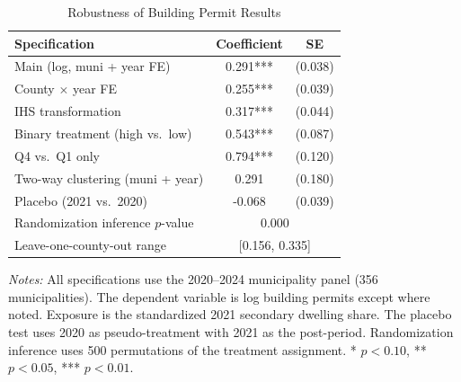 \begin{table}[t]
\centering
\caption{Robustness of Building Permit Results}
\label{tab:robustness}
\begin{tabular}{lcc}
\hline\hline
Specification & Coefficient & SE \\
\hline
Main (log, muni + year FE) & 0.291*** & (0.038) \\
County $\times$ year FE & 0.255*** & (0.039) \\
IHS transformation & 0.317*** & (0.044) \\
Binary treatment (high vs.\ low) & 0.543*** & (0.087) \\
Q4 vs.\ Q1 only & 0.794*** & (0.120) \\
Two-way clustering (muni + year) & 0.291 & (0.180) \\
Placebo (2021 vs.\ 2020) & -0.068 & (0.039) \\
\hline
Randomization inference $p$-value & \multicolumn{2}{c}{0.000} \\
Leave-one-county-out range & \multicolumn{2}{c}{[0.156, 0.335]} \\
\hline\hline
\end{tabular}
\begin{minipage}{0.85\textwidth}
\vspace{0.3em}
\footnotesize \textit{Notes:} All specifications use the 2020--2024 municipality panel (356 municipalities). The dependent variable is log building permits except where noted. Exposure is the standardized 2021 secondary dwelling share. The placebo test uses 2020 as pseudo-treatment with 2021 as the post-period. Randomization inference uses 500 permutations of the treatment assignment. * $p<0.10$, ** $p<0.05$, *** $p<0.01$.
\end{minipage}
\end{table}

